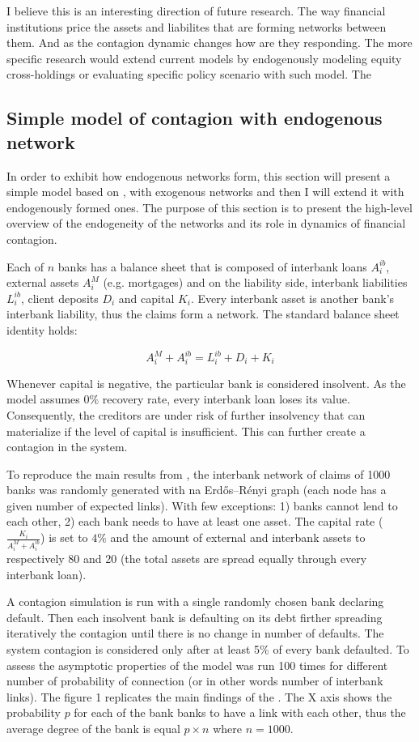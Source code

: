 \documentclass{article}
\begin{document}
I believe this is an interesting direction of future research. The way financial institutions price the assets and liabilites that are forming networks between them. And as the contagion dynamic changes how are they responding. The more specific research would extend current models by endogenously modeling equity cross-holdings or evaluating specific policy scenario with such model. The 

\subsection*{Simple model of contagion with endogenous network}

In order to exhibit how endogenous networks form, this section will present a simple model based on \citet{gai}, with exogenous networks and then I will extend it with endogenously formed ones. The purpose of this section is to present the high-level overview of the endogeneity of the networks and its role in dynamics of financial contagion.

Each of $n$ banks has a balance sheet that is composed of interbank loans $A^{ib}_i$, external assets $A^{M}_i$ (e.g. mortgages) and on the liability side, interbank liabilities $L^{ib}_i$, client deposits $D_i$ and capital $K_i$. Every interbank asset is another bank's interbank liability, thus the claims form a network. The standard balance sheet identity holds:

$$A^{M}_i + A^{ib}_i = L^{ib}_i + D_i + K_i$$

Whenever capital is negative, the particular bank is considered insolvent. As the model assumes $0\%$ recovery rate, every interbank loan loses its value. Consequently, the creditors are under risk of further insolvency that can materialize if the level of capital is insufficient. This can further create a contagion in the system. 

To reproduce the main results from \citet{gai}, the interbank network of claims of 1000 banks was randomly generated with na Erdős–Rényi graph (each node has a given number of expected links). With few exceptions: 1) banks cannot lend to each other, 2) each bank needs to have at least one asset. The capital rate ($\frac{K_i}{A^{M}_i + A^{ib}_i}$) is set to $4\%$ and the amount of external and interbank assets to respectively 80 and 20 (the total assets are spread equally through every interbank loan). 

A contagion simulation is run with a single randomly chosen bank declaring default. Then each insolvent bank is defaulting on its debt firther spreading iteratively the contagion until there is no change in number of defaults. The system contagion is considered only after at least 5\% of every bank defaulted. To assess the asymptotic properties of the model was run 100 times for different number of probability of connection (or in other words number of interbank links). The figure 1 replicates the main findings of the \citet{gai}. The X axis shows the probability $p$ for each of the bank banks to have a link with each other, thus the average degree of the bank is equal $p \times n$ where $n = 1000$. 
\end{document}
